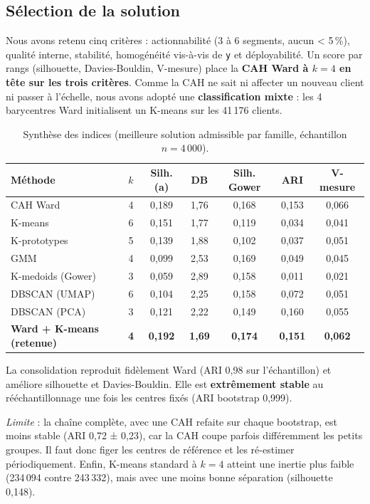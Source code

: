 \documentclass[11pt,a4paper]{article}
\begin{document}
\subsection{Sélection de la solution}
Nous avons retenu cinq critères : actionnabilité (3 à 6 segments, aucun < 5\,\%), qualité interne, stabilité, homogénéité vis-à-vis de \texttt{y} et déployabilité. Un score par rangs (silhouette, Davies-Bouldin, V-mesure) place la \textbf{CAH Ward à $k=4$ en tête sur les trois critères}. Comme la CAH ne sait ni affecter un nouveau client ni passer à l'échelle, nous avons adopté une \textbf{classification mixte} : les 4 barycentres Ward initialisent un K-means sur les 41\,176 clients.

\begin{table}[H]\centering\small
\begin{tabular}{lcccccc}\toprule
Méthode & $k$ & Silh. (a) & DB & Silh. Gower & ARI & V-mesure\\\midrule
CAH Ward & 4 & 0,189 & 1,76 & 0,168 & 0,153 & 0,066\\
K-means & 6 & 0,151 & 1,77 & 0,119 & 0,034 & 0,041\\
K-prototypes & 5 & 0,139 & 1,88 & 0,102 & 0,037 & 0,051\\
GMM & 4 & 0,099 & 2,53 & 0,169 & 0,049 & 0,045\\
K-medoids (Gower) & 3 & 0,059 & 2,89 & 0,158 & 0,011 & 0,021\\
DBSCAN (UMAP) & 6 & 0,104 & 2,25 & 0,158 & 0,072 & 0,051\\
DBSCAN (PCA) & 3 & 0,121 & 2,22 & 0,149 & 0,160 & 0,055\\\midrule
\textbf{Ward + K-means (retenue)} & \textbf{4} & \textbf{0,192} & \textbf{1,69} & \textbf{0,174} & \textbf{0,151} & \textbf{0,062}\\\bottomrule
\end{tabular}
\caption{Synthèse des indices (meilleure solution admissible par famille, échantillon $n=4\,000$).}\label{tab:synth}
\end{table}

La consolidation reproduit fidèlement Ward (ARI 0,98 sur l'échantillon) et améliore silhouette et Davies-Bouldin. Elle est \textbf{extrêmement stable} au rééchantillonnage une fois les centres fixés (ARI bootstrap 0,999).

\emph{Limite} : la chaîne complète, avec une CAH refaite sur chaque bootstrap, est moins stable (ARI 0,72 ± 0,23), car la CAH coupe parfois différemment les petits groupes. Il faut donc figer les centres de référence et les ré-estimer périodiquement. Enfin, K-means standard à $k=4$ atteint une inertie plus faible (234\,094 contre 243\,332), mais avec une moins bonne séparation (silhouette 0,148).
\end{document}
